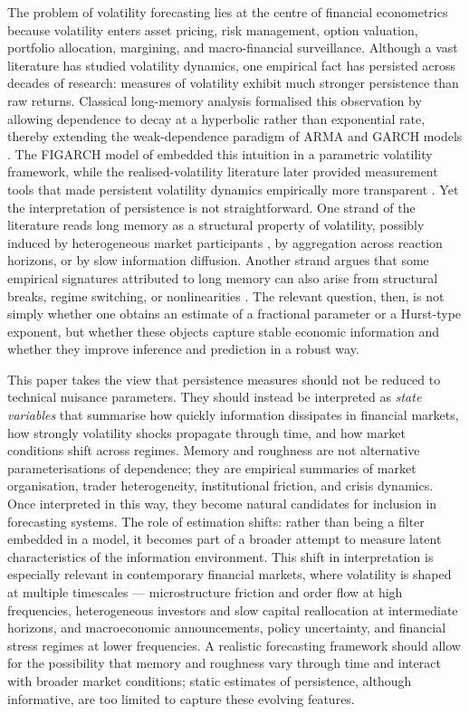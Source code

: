 \documentclass[11pt,a4paper]{article}
\begin{document}
The problem of volatility forecasting lies at the centre of financial
econometrics because volatility enters asset pricing, risk management,
option valuation, portfolio allocation, margining, and macro-financial
surveillance. Although a vast literature has studied volatility dynamics,
one empirical fact has persisted across decades of research: measures of
volatility exhibit much stronger persistence than raw returns. Classical
long-memory analysis formalised this observation by allowing dependence to
decay at a hyperbolic rather than exponential rate, thereby extending the
weak-dependence paradigm of ARMA and GARCH models
\citep{granger1980introduction,hosking1981fractional,ding1993long}. The
FIGARCH model of \citet{baillie1996fractionally} embedded this intuition in
a parametric volatility framework, while the realised-volatility literature
later provided measurement tools that made persistent volatility dynamics
empirically more transparent \citep{andersen2003modeling,
barndorff2002econometric,corsi2009simple}. Yet the interpretation of
persistence is not straightforward. One strand of the literature reads
long memory as a structural property of volatility, possibly induced by
heterogeneous market participants \citep{muller1997volatilities}, by
aggregation across reaction horizons, or by slow information diffusion.
Another strand argues that some empirical signatures attributed to long
memory can also arise from structural breaks, regime switching, or
nonlinearities \citep{mikosch2004nonstationarities,gatheral2018volatility}.
The relevant question, then, is not simply whether one obtains an estimate
of a fractional parameter or a Hurst-type exponent, but whether these
objects capture stable economic information and whether they improve
inference and prediction in a robust way.

This paper takes the view that persistence measures should not be reduced
to technical nuisance parameters. They should instead be interpreted as
\emph{state variables} that summarise how quickly information dissipates in
financial markets, how strongly volatility shocks propagate through time,
and how market conditions shift across regimes. Memory and roughness are not
alternative parameterisations of dependence; they are empirical summaries of
market organisation, trader heterogeneity, institutional friction, and
crisis dynamics. Once interpreted in this way, they become natural
candidates for inclusion in forecasting systems. The role of estimation
shifts: rather than being a filter embedded in a model, it becomes part of
a broader attempt to measure latent characteristics of the information
environment. This shift in interpretation is especially relevant in
contemporary financial markets, where volatility is shaped at multiple
timescales --- microstructure friction and order flow at high frequencies,
heterogeneous investors and slow capital reallocation at intermediate
horizons, and macroeconomic announcements, policy uncertainty, and
financial stress regimes at lower frequencies. A realistic forecasting
framework should allow for the possibility that memory and roughness vary
through time and interact with broader market conditions; static estimates
of persistence, although informative, are too limited to capture these
evolving features.
\end{document}
